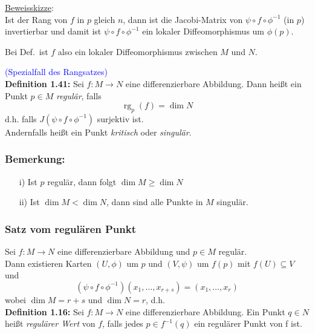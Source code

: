 \documentclass[fleqn, 12pt, letterpaper]{article}
\begin{document}
\underline{Beweisskizze}:\\
Ist der Rang von $f$ in $p$ gleich $n$, dann ist die Jacobi-Matrix von $\psi \circ f \circ \phi^{-1}$ (in $p$) invertierbar und damit ist $\psi \circ f \circ \phi^{-1}$ ein lokaler Diffeomorphismus um $\phi(p)$.

Bei Def.\ ist $f$ also ein lokaler Diffeomorphismus zwischen $M$ und $N$.

\vspace{0.5em}
\textcolor{blue}{\small(Spezialfall des Rangsatzes)}\\

\textbf{Definition 1.41:} Sei $f : M \to N$ eine differenzierbare Abbildung. Dann heißt ein Punkt $p \in M$ \emph{regulär}, falls
\[
\operatorname{rg}_p(f) = \dim N
\]
d.h. falls $J(\psi\circ f\circ\phi^{-1})$ surjektiv ist.\\
Andernfalls heißt ein Punkt \emph{kritisch} oder \emph{singulär}.

\subsubsection*{Bemerkung:}
\begin{itemize}
  \item[i)] Ist $p$ regulär, dann folgt $\dim M \geq \dim N$
  \item[ii)] Ist $\dim M < \dim N$, dann sind alle Punkte in $M$ singulär.
\end{itemize}

\subsubsection*{Satz vom regulären Punkt}
Sei $f : M \to N$ eine differenzierbare Abbildung und $p \in M$ regulär.\\
Dann existieren Karten $(U, \phi)$ um $p$ und $(V, \psi)$ um $f(p)$ mit $f(U) \subseteq V$ und
\[
(\psi \circ f \circ \phi^{-1})(x_1, \dots, x_{r+s}) = (x_1, \dots, x_r)
\]
wobei $\dim M = r + s$ und $\dim N = r$, d.h.  \\


\textbf{Definition 1.16:} Sei $f : M \to N$ eine differenzierbare Abbildung. Ein Punkt $q \in N$ heißt \emph{regulärer Wert} von $f$, falls jedes $p \in f^{-1}(q)$ ein regulärer Punkt von f ist.
\end{document}
